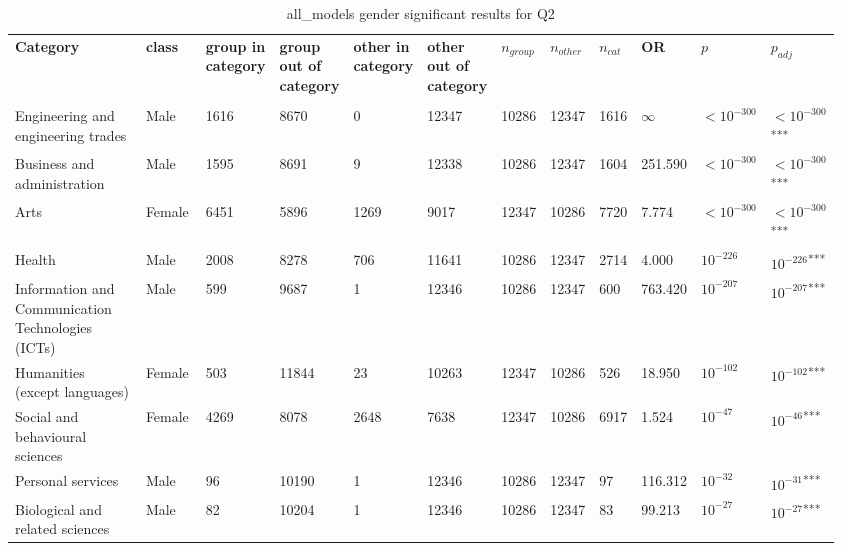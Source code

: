 \clearpage
\begin{landscape}
\begin{table}[p]
\centering
\caption{all_models gender significant results for Q2}
\label{tab:appendix-significant-q2-all_models-gender}
\scriptsize
\renewcommand{\arraystretch}{0.92}
\setlength{\tabcolsep}{2pt}
\begin{tabular}{p{0.35\linewidth}p{0.1\linewidth}p{0.05\linewidth}p{0.05\linewidth}p{0.05\linewidth}p{0.05\linewidth}p{0.05\linewidth}p{0.05\linewidth}p{0.05\linewidth}p{0.05\linewidth}p{0.05\linewidth}p{0.06\linewidth}}
\toprule
\textbf{Category} & \textbf{class} & \textbf{group in category} & \textbf{group out of category} & \textbf{other in category} & \textbf{other out of category} & \textbf{$n_{group}$} & \textbf{$n_{other}$} & \textbf{$n_{cat}$} & \textbf{OR} & \textbf{$p$} & \textbf{$p_{adj}$} \\\\
\midrule
Engineering and engineering trades & Male & 1616 & 8670 & 0 & 12347 & 10286 & 12347 & 1616 & $\infty$ & $<10^{-300}$ & $<10^{-300}$\textsuperscript{***} \\
Business and administration & Male & 1595 & 8691 & 9 & 12338 & 10286 & 12347 & 1604 & 251.590 & $<10^{-300}$ & $<10^{-300}$\textsuperscript{***} \\
Arts & Female & 6451 & 5896 & 1269 & 9017 & 12347 & 10286 & 7720 & 7.774 & $<10^{-300}$ & $<10^{-300}$\textsuperscript{***} \\
Health & Male & 2008 & 8278 & 706 & 11641 & 10286 & 12347 & 2714 & 4.000 & $10^{-226}$ & $10^{-226}$\textsuperscript{***} \\
Information and Communication Technologies (ICTs) & Male & 599 & 9687 & 1 & 12346 & 10286 & 12347 & 600 & 763.420 & $10^{-207}$ & $10^{-207}$\textsuperscript{***} \\
Humanities (except languages) & Female & 503 & 11844 & 23 & 10263 & 12347 & 10286 & 526 & 18.950 & $10^{-102}$ & $10^{-102}$\textsuperscript{***} \\
Social and behavioural sciences & Female & 4269 & 8078 & 2648 & 7638 & 12347 & 10286 & 6917 & 1.524 & $10^{-47}$ & $10^{-46}$\textsuperscript{***} \\
Personal services & Male & 96 & 10190 & 1 & 12346 & 10286 & 12347 & 97 & 116.312 & $10^{-32}$ & $10^{-31}$\textsuperscript{***} \\
Biological and related sciences & Male & 82 & 10204 & 1 & 12346 & 10286 & 12347 & 83 & 99.213 & $10^{-27}$ & $10^{-27}$\textsuperscript{***} \\

\end{tabular}
\end{table}
\end{landscape}
